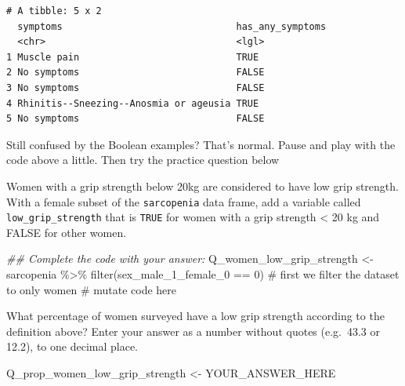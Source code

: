 \documentclass[
  letterpaper,
  DIV=11,
  numbers=noendperiod]{scrreprt}
\newenvironment{Shaded}{\begin{snugshade}}{\end{snugshade}}
\newcommand{\CommentTok}[1]{\textcolor[rgb]{0.37,0.37,0.37}{#1}}
\newcommand{\DecValTok}[1]{\textcolor[rgb]{0.68,0.00,0.00}{#1}}
\newcommand{\DocumentationTok}[1]{\textcolor[rgb]{0.37,0.37,0.37}{\textit{#1}}}
\newcommand{\FunctionTok}[1]{\textcolor[rgb]{0.28,0.35,0.67}{#1}}
\newcommand{\NormalTok}[1]{\textcolor[rgb]{0.00,0.23,0.31}{#1}}
\newcommand{\OtherTok}[1]{\textcolor[rgb]{0.00,0.23,0.31}{#1}}
\newcommand{\SpecialCharTok}[1]{\textcolor[rgb]{0.37,0.37,0.37}{#1}}
\begin{document}
\begin{verbatim}
# A tibble: 5 x 2
  symptoms                               has_any_symptoms
  <chr>                                  <lgl>           
1 Muscle pain                            TRUE            
2 No symptoms                            FALSE           
3 No symptoms                            FALSE           
4 Rhinitis--Sneezing--Anosmia or ageusia TRUE            
5 No symptoms                            FALSE           
\end{verbatim}

Still confused by the Boolean examples? That's normal. Pause and play
with the code above a little. Then try the practice question below

\begin{tcolorbox}[enhanced jigsaw, colframe=quarto-callout-tip-color-frame, rightrule=.15mm, opacityback=0, breakable, coltitle=black, colbacktitle=quarto-callout-tip-color!10!white, bottomrule=.15mm, leftrule=.75mm, toprule=.15mm, arc=.35mm, bottomtitle=1mm, colback=white, left=2mm, opacitybacktitle=0.6, titlerule=0mm, title=\textcolor{quarto-callout-tip-color}{\faLightbulb}\hspace{0.5em}{Practice}, toptitle=1mm]

Women with a grip strength below 20kg are considered to have low grip
strength. With a female subset of the \texttt{sarcopenia} data frame,
add a variable called \texttt{low\_grip\_strength} that is \texttt{TRUE}
for women with a grip strength \textless{} 20 kg and FALSE for other
women.

\begin{Shaded}
\begin{Highlighting}[]
\DocumentationTok{\#\# Complete the code with your answer:}
\NormalTok{Q\_women\_low\_grip\_strength }\OtherTok{\textless{}{-}} 
\NormalTok{  sarcopenia }\SpecialCharTok{\%\textgreater{}\%} 
  \FunctionTok{filter}\NormalTok{(sex\_male\_1\_female\_0 }\SpecialCharTok{==} \DecValTok{0}\NormalTok{) }\CommentTok{\# first we filter the dataset to only women}
  \CommentTok{\# mutate code here}
\end{Highlighting}
\end{Shaded}

What percentage of women surveyed have a low grip strength according to
the definition above? Enter your answer as a number without quotes
(e.g.~43.3 or 12.2), to one decimal place.

\begin{Shaded}
\begin{Highlighting}[]
\NormalTok{Q\_prop\_women\_low\_grip\_strength }\OtherTok{\textless{}{-}}\NormalTok{ YOUR\_ANSWER\_HERE}
\end{Highlighting}
\end{Shaded}

\end{tcolorbox}
\end{document}
